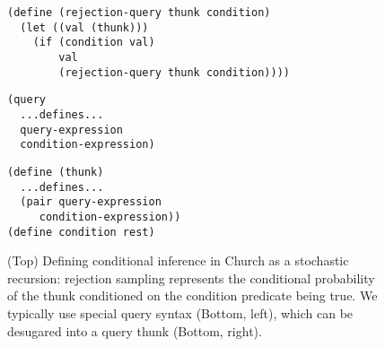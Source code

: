 \documentclass[12pt]{article}
\begin{document}
\begin{figure}[tbp]
\begin{center}

\begin{minipage}[b]{0.7\linewidth}

\begin{lstlisting}
(define (rejection-query thunk condition)
  (let ((val (thunk)))
    (if (condition val)
        val
        (rejection-query thunk condition))))
\end{lstlisting}
\end{minipage}


\begin{minipage}[b]{0.3\linewidth}
\begin{lstlisting}
(query
  ...defines...
  query-expression
  condition-expression)
\end{lstlisting}
\end{minipage}
\hspace{2em}
\begin{minipage}[b]{0.3\linewidth}
\begin{lstlisting}
(define (thunk)
  ...defines...
  (pair query-expression
     condition-expression))
(define condition rest)
\end{lstlisting}
\end{minipage}

\caption{(Top) Defining conditional inference in Church as a stochastic recursion: rejection sampling represents the conditional probability of the thunk conditioned on the condition predicate being true. We typically use special query syntax (Bottom, left), which can be desugared into a query thunk (Bottom, right).}
\label{query}
\end{center}
\end{figure}
\end{document}
